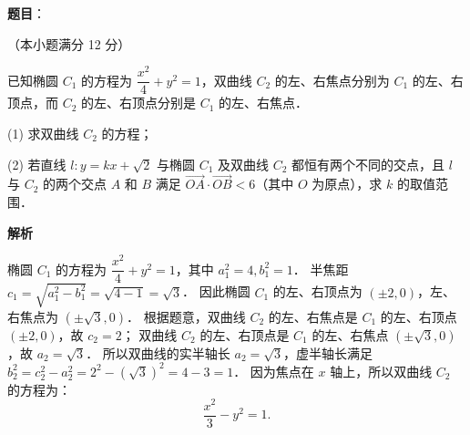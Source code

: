 \begin{answer}

\textbf{题目}：

（本小题满分 12 分）

已知椭圆 $C_1$ 的方程为 $\dfrac{x^2}{4} + y^2 = 1$，双曲线 $C_2$ 的左、右焦点分别为 $C_1$ 的左、右顶点，而 $C_2$ 的左、右顶点分别是 $C_1$ 的左、右焦点．

(1) 求双曲线 $C_2$ 的方程；

(2) 若直线 $l: y = kx + \sqrt{2}$ 与椭圆 $C_1$ 及双曲线 $C_2$ 都恒有两个不同的交点，且 $l$ 与 $C_2$ 的两个交点 $A$ 和 $B$ 满足 $\overrightarrow{OA} \cdot \overrightarrow{OB} < 6$（其中 $O$ 为原点），求 $k$ 的取值范围．

\textbf{解析}


椭圆 $C_1$ 的方程为 $\dfrac{x^2}{4} + y^2 = 1$，其中 $a_1^2 = 4, b_1^2 = 1$．
半焦距 $c_1 = \sqrt{a_1^2 - b_1^2} = \sqrt{4 - 1} = \sqrt{3}$．
因此椭圆 $C_1$ 的左、右顶点为 $(\pm 2, 0)$，左、右焦点为 $(\pm\sqrt{3}, 0)$．
根据题意，双曲线 $C_2$ 的左、右焦点是 $C_1$ 的左、右顶点 $(\pm 2, 0)$，故 $c_2 = 2$；
双曲线 $C_2$ 的左、右顶点是 $C_1$ 的左、右焦点 $(\pm\sqrt{3}, 0)$，故 $a_2 = \sqrt{3}$．
所以双曲线的实半轴长 $a_2 = \sqrt{3}$，虚半轴长满足 $b_2^2 = c_2^2 - a_2^2 = 2^2 - (\sqrt{3})^2 = 4 - 3 = 1$．
因为焦点在 $x$ 轴上，所以双曲线 $C_2$ 的方程为：
\nopagebreak[4]
\[
\frac{x^2}{3} - y^2 = 1.
\]



\end{answer}
